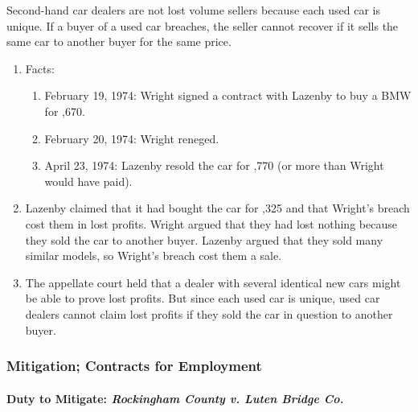 Second-hand car dealers are not lost volume sellers because each used car is 
unique. If a buyer of a used car breaches, the seller cannot recover if it 
sells the same car to another buyer for the same price.

\begin{enumerate}
    \item Facts:
    \begin{enumerate}
        \item February 19, 1974: Wright signed a contract with Lazenby to buy 
        a BMW for ,670.
        \item February 20, 1974: Wright reneged.
        \item April 23, 1974: Lazenby resold the car for ,770 
        (or  more than Wright would have paid).
    \end{enumerate}
    \item Lazenby claimed that it had bought the car for ,325 
    and that Wright's breach cost them  in lost profits. 
    Wright argued that they had lost nothing because they sold the car to 
    another buyer. Lazenby argued that they sold many similar models, so 
    Wright's breach cost them a sale.
    \item The appellate court held that a dealer with several identical new 
    cars might be able to prove lost profits. But since each used car is 
    unique, used car dealers cannot claim lost profits if they sold the car in 
    question to another buyer.
\end{enumerate}

\subsubsection{Mitigation; Contracts for Employment}

\paragraph{Duty to Mitigate: \emph{Rockingham County v. Luten Bridge Co.}}

